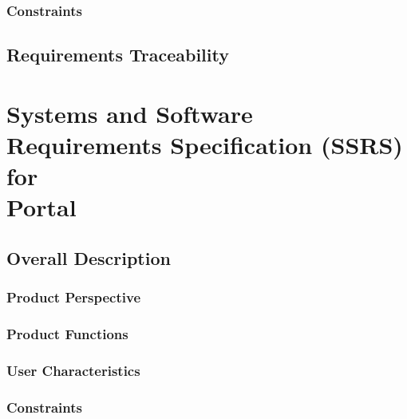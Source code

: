 \documentclass[12pt, oneside, letterpaper]{report}
\begin{document}
	\section{Constraints}
		

%		

\chapter{Requirements Traceability}
		


\part{Systems and Software Requirements Specification (SSRS) \\ for \\ Portal}

\chapter{Overall Description}


	\section{Product Perspective}
		
	\section{Product Functions}
		
	\section{User Characteristics}
		
	\section{Constraints}
		
\end{document}

